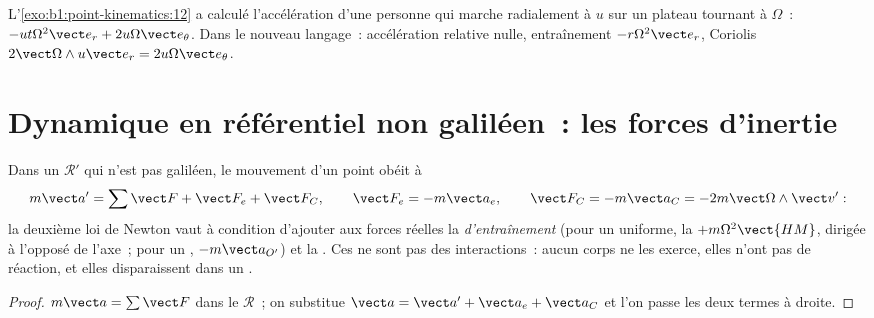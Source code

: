 \begin{example}\label{ex:b1:non-inertial-frames:turntable}
L'\cref{exo:b1:point-kinematics:12} a calculé l'accélération d'une
personne qui marche radialement à $u$ sur un plateau tournant à $\Omega$~: $-ut\Omega^2\vect e_r
+ 2u\Omega\vect e_\theta$. Dans le nouveau langage~: accélération relative
nulle, entraînement $-r\Omega^2\vect e_r$, Coriolis $2\vect\Omega\wedge u\vect e_r = 2u\Omega\vect e_\theta$.
\end{example}

\section{Dynamique en référentiel non galiléen~: les forces d'inertie}

\begin{theorem}\label{thm:b1:non-inertial-frames:dynamics}
Dans un  $\mathcal R'$ qui n'est pas galiléen, le mouvement
d'un point obéit à
\[
m\vect a' = \sum\vect F + \vect F_e + \vect F_C, \qquad
\vect F_e = -m\vect a_e, \qquad \vect F_C = -m\vect a_C = -2m\vect\Omega\wedge\vect v' :
\]
la deuxième loi de Newton vaut à condition d'ajouter aux forces réelles
la \emph{ d'entraînement} (pour un  uniforme, la \emph{}
$+m\Omega^2\vect{HM}$, dirigée à l'opposé de l'axe~; pour un , $-m\vect a_{O'}$) et la \emph{}. Ces
\emph{} ne sont pas des interactions~: aucun corps ne
les exerce, elles n'ont pas de réaction, et elles disparaissent dans un
.
\end{theorem}

\begin{proof}
$m\vect a = \sum\vect F$ dans le  $\mathcal R$~; on
substitue $\vect a = \vect a' + \vect a_e + \vect a_C$ et l'on passe les
deux termes à droite.
\end{proof}

